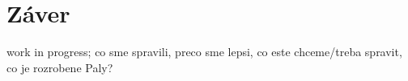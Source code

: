 \section{Záver}
work in progress; co sme spravili, preco sme lepsi, co este chceme/treba spravit, co je rozrobene
Paly?
